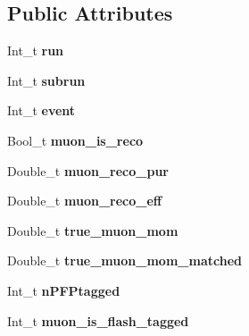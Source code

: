 \subsection*{Public Attributes}
\begin{DoxyCompactItemize}
\item 
\hypertarget{classUBXSecEvent_ad26e1c100cfe11d9f7c48a3760cdcc07}{Int\-\_\-t {\bfseries run}}\label{classUBXSecEvent_ad26e1c100cfe11d9f7c48a3760cdcc07}

\item 
\hypertarget{classUBXSecEvent_a15ac0be3ec941ed67ee78d27da704abb}{Int\-\_\-t {\bfseries subrun}}\label{classUBXSecEvent_a15ac0be3ec941ed67ee78d27da704abb}

\item 
\hypertarget{classUBXSecEvent_a5833c043eb96d5d41935cd1c6eaec722}{Int\-\_\-t {\bfseries event}}\label{classUBXSecEvent_a5833c043eb96d5d41935cd1c6eaec722}

\item 
\hypertarget{classUBXSecEvent_a429e2c8750cdd32b073548b73c5ebd68}{Bool\-\_\-t {\bfseries muon\-\_\-is\-\_\-reco}}\label{classUBXSecEvent_a429e2c8750cdd32b073548b73c5ebd68}

\item 
\hypertarget{classUBXSecEvent_ac1391d470b732d86bb9e462d49fff185}{Double\-\_\-t {\bfseries muon\-\_\-reco\-\_\-pur}}\label{classUBXSecEvent_ac1391d470b732d86bb9e462d49fff185}

\item 
\hypertarget{classUBXSecEvent_aa713bc31919706a03a5a11034dcbda7c}{Double\-\_\-t {\bfseries muon\-\_\-reco\-\_\-eff}}\label{classUBXSecEvent_aa713bc31919706a03a5a11034dcbda7c}

\item 
\hypertarget{classUBXSecEvent_a967af89c3282493ba4ec96a4bf1592e9}{Double\-\_\-t {\bfseries true\-\_\-muon\-\_\-mom}}\label{classUBXSecEvent_a967af89c3282493ba4ec96a4bf1592e9}

\item 
\hypertarget{classUBXSecEvent_ac01db50f50e39aed219935666f441aed}{Double\-\_\-t {\bfseries true\-\_\-muon\-\_\-mom\-\_\-matched}}\label{classUBXSecEvent_ac01db50f50e39aed219935666f441aed}

\item 
\hypertarget{classUBXSecEvent_a64e18b32773515202fcb167d1818133b}{Int\-\_\-t {\bfseries n\-P\-F\-Ptagged}}\label{classUBXSecEvent_a64e18b32773515202fcb167d1818133b}

\item 
\hypertarget{classUBXSecEvent_a33857278922a2779d3daaf30624a2462}{Int\-\_\-t {\bfseries muon\-\_\-is\-\_\-flash\-\_\-tagged}}\label{classUBXSecEvent_a33857278922a2779d3daaf30624a2462}


\end{DoxyCompactItemize}
